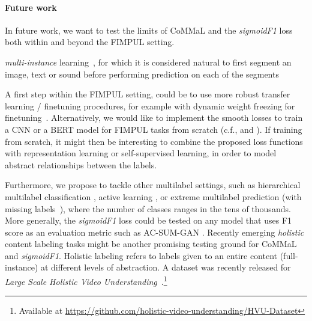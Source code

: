 \paragraph{Future work}
In future work, we want to test the limits of CoMMaL and the \emph{sigmoidF1} loss both within and beyond the FIMPUL setting.
%


\emph{multi-instance} learning~\citep[e.g.,][]{multiInstance,multiInstanceMultiLabel}, for which it is considered natural to first segment an image, text or sound before performing prediction on each of the segments

A first step within the FIMPUL setting, could be to use more robust transfer learning / finetuning procedures, for example with dynamic weight freezing for finetuning~\cite{ULMFit}. Alternatively, we would like to implement the smooth losses to train a CNN or a BERT model for FIMPUL tasks from scratch (c.f., \cite{tencent} and \cite{focalLoss}). If training from scratch, it might then be interesting to combine the proposed loss functions with representation learning \cite{unsupervisedImage,highResRepresentation} or self-supervised learning, in order to model abstract relationships between the labels.

Furthermore, we propose to tackle other multilabel settings, such as hierarchical multilabel classification \cite{HARAM}, active learning \cite{activeLearningMultiLabel}, or extreme multilabel prediction \cite{extremeMultilabelText, extremeSIGIR, extremeClassification, millionsOfLabels, extremeDiSMEC, extremePPDsparse, extremeParabel} (with missing labels~\cite{exteremeMissing, exteremeMissingApplications}), where the number of classes ranges in the tens of thousands.  More generally, the \emph{sigmoidF1} loss could be tested on any model that uses F1 score as an evaluation metric such as AC-SUM-GAN \cite{AC-SUM-GAN}.
Recently emerging \textit{holistic} content labeling tasks might be another promising testing ground for CoMMaL and \emph{sigmoidF1}. Holistic labeling refers to labels given to an entire content (full-instance) at different levels of abstraction. A dataset was recently released for \emph{Large Scale Holistic Video Understanding}~\cite{holisticVideoData}.\footnote{Available at \url{https://github.com/holistic-video-understanding/HVU-Dataset}}
\vspace{\baselineskip}

